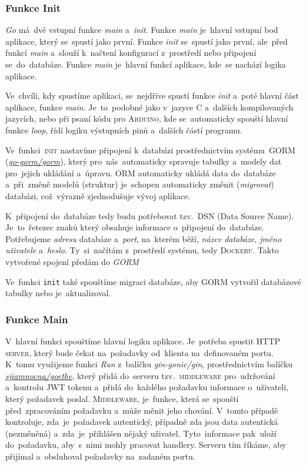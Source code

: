 \documentclass[14pt,a4paper]{article}
\begin{document}
            \subsubsection{Funkce Init}
            \emph{Go} má~dvě vstupní funkce \emph{main} a~\emph{init}. Funkce \emph{main} je~hlavní vstupní bod aplikace, který se~spustí jako první. Funkce \emph{init} se~spustí jako první, ale~před funkcí \emph{main} a~slouží k~načtení konfigurací z~prostředí nebo připojení se~do~databáze. Funkce \emph{main} je~hlavní funkcí aplikace, kde~se nachází logika aplikace.

            Ve~chvíli, kdy spustíme aplikaci, se~nejdříve spustí funkce \emph{init} a~poté hlavní část aplikace, funkce \emph{main}. Je~to~podobné jako v~jazyce C a~dalších kompilovaných jazycích, nebo při psaní kódu pro \textsc{Arduino}, kde se~automaticky spouští hlavní funkce \emph{loop}, řídí logiku výstupních pinů a~dalších částí programu.
            
            Ve~funkci~\textsc{init} nastavíme připojení k~databázi prostřednictvím systému~\textsc{GORM} (\href{https://gorm.io/}{\emph{go-gorm/gorm}}), který pro~nás~automaticky spravuje tabulky a~modely dat pro~jejich ukládání a~úpravu. \textsc{ORM} automaticky ukládá data do~databáze a~při~změně modelů (struktur) je~schopen automaticky změnit (\emph{migrovat}) databázi, což~výrazně zjednodušuje vývoj aplikace.

            K~připojení do~databáze tedy budu potřebovat tzv.~\textsc{DSN} (Data Source Name). Je~to~řetezec znaků který obsahuje informace o~připojení do~databáze. Potřebujeme \emph{adresu} databáze a~\emph{port}, na~kterém běží, \emph{název databáze}, \emph{jméno uživatele} a~\emph{heslo}. Ty~si~načítám z~prostředí systému, tedy \textsc{Dockeru}. Takto vytvořené spojení předám do \emph{GORM}

            Ve~funkci \texttt{init} také spouštíme migraci databáze, aby \textsc{GORM} vytvořil databázové tabulky nebo je~aktualizoval.


            \subsubsection{Funkce Main}
            V~hlavní funkci spouštíme hlavní logiku aplikace. Je~potřeba spustit \textsc{HTTP server}, který bude čekat na~požadavky od~klienta na~definovaném portu. K~tomu využijeme funkci \emph{Run} z~balíčku \emph{gin-gonic/gin}, prostřednictvím balíčku \href{https://gitlab.com/sjiamnocna/goethe}{\emph{sjiamnocna/goethe}}, který přidá do~serveru tzv.~\textsc{middleware} pro~udržování a~kontrolu \textsc{JWT} tokenu a~přidá do~každého požadavku informace o~uživateli, který požadavek poslal. \textsc{Middleware}, je~funkce, která se~spouští před~zpracováním požadavku a~může měnit jeho chování. V~tomto případě kontroluje, zda~je~požadavek autentický, případně zda jsou data autentická (nezměněná) a~zda~je~přihlášen nějaký uživatel. Tyto~informace pak~uloží do~požadavku, aby~s~nimi mohly pracovat handlery. Serveru tím říkáme, aby přijímal a~obsluhoval požadavky na~zadaném portu.
\end{document}
